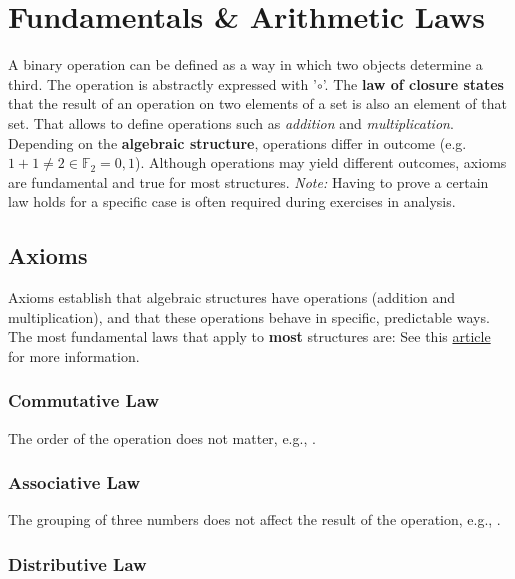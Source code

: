 \chapter{Fundamentals \& Arithmetic Laws}\label{FundamentalArithmeticLaws}

A binary operation can be defined as a way in which two objects determine a third. The operation is abstractly expressed with '$\circ$'. The \textbf{law of closure states} that the result of an operation on two elements of a set is also an element of that set. That allows to define operations such as \textit{addition} and \textit{multiplication}.
Depending on the \textbf{algebraic structure}, operations differ in outcome (e.g. $1 +1 \neq 2 \in \mathbb{F}_{2} = {0,1}$). 
Although operations may yield different outcomes, axioms are fundamental and true for most structures. \textit{Note:} Having to prove a certain law holds for a specific case is often required during exercises in analysis.

\section{Axioms}\label{Axioms}
Axioms establish that algebraic structures have operations (addition and multiplication), and that these operations behave in specific, predictable ways. The most fundamental laws that apply to \textbf{most} structures are:
See this \href{https://math.libretexts.org/Bookshelves/Analysis/Mathematical_Analysis_(Zakon)/02%3A_Real_Numbers_and_Fields/2.01%3A_Axioms_and_Basic_Definitions}{article} for more information.

\subsection{Commutative Law}\label{Commutative Law}

The order of the operation does not matter, e.g., 
.

\subsection{Associative Law}\label{Associative Law}

The grouping of three numbers does not affect the result of the operation, e.g., 
.

\subsection{Distributive Law}\label{Distributive Law}

